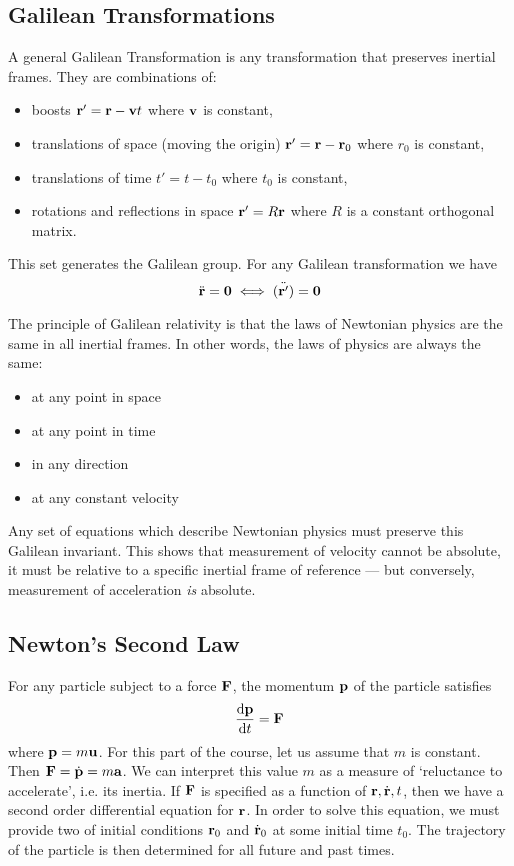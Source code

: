 \documentclass{article}
\begin{document}
\subsection{Galilean Transformations}
A general Galilean Transformation is any transformation that preserves inertial frames. They are combinations of:
\begin{itemize}
	\item boosts $\vb r' = \vb r - \vb vt$ where $\vb v$ is constant,
	\item translations of space (moving the origin) $\vb r' = \vb r - \vb r_0$ where $r_0$ is constant,
	\item translations of time $t' = t - t_0$ where $t_0$ is constant,
	\item rotations and reflections in space $\vb r' = R \vb r$ where $R$ is a constant orthogonal matrix.
\end{itemize}
This set generates the Galilean group. For any Galilean transformation we have
\[ \ddot{\vb r} = \vb 0 \iff \ddot{(\vb r')} = \vb 0 \]

The principle of Galilean relativity is that the laws of Newtonian physics are the same in all inertial frames. In other words, the laws of physics are always the same:
\begin{itemize}
	\item at any point in space
	\item at any point in time
	\item in any direction
	\item at any constant velocity
\end{itemize}
Any set of equations which describe Newtonian physics must preserve this Galilean invariant. This shows that measurement of velocity cannot be absolute, it must be relative to a specific inertial frame of reference --- but conversely, measurement of acceleration \textit{is} absolute.

\subsection{Newton's Second Law}
For any particle subject to a force $\vb F$, the momentum $\vb p$ of the particle satisfies
\[ \frac{\dd \vb p}{\dd{t}} = \vb F \]
where $\vb p = m \vb u$. For this part of the course, let us assume that $m$ is constant. Then $\vb F = \dot{\vb p} = m \vb a$. We can interpret this value $m$ as a measure of `reluctance to accelerate', i.e. its inertia. If $\vb F$ is specified as a function of $\vb r, \dot{\vb r}, t$, then we have a second order differential equation for $\vb r$. In order to solve this equation, we must provide two of initial conditions $\vb r_0$ and $\dot{\vb r}_0$ at some initial time $t_0$. The trajectory of the particle is then determined for all future and past times.
\end{document}
